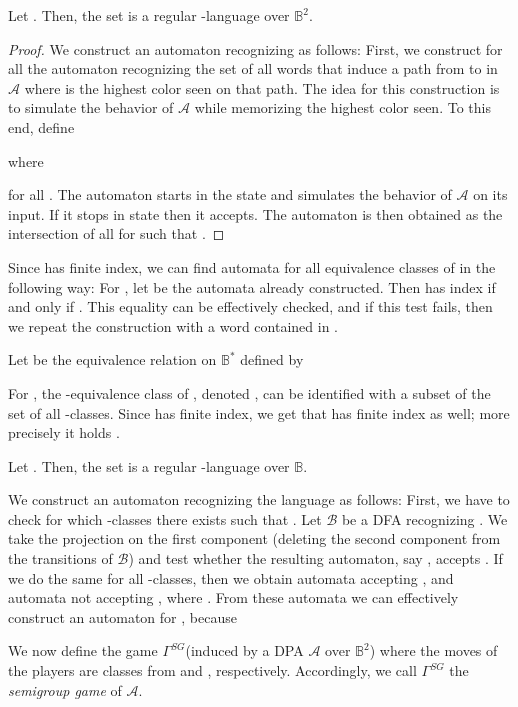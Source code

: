 \documentclass[fleqn,envcountsame]{LMCS}
\newcommand{\aut}[1]{\ensuremath{\mathcal{#1}}}
\newcommand{\GSG}{\ensuremath{\Gamma^{SG}}\xspace}
\newcommand{\B}{\ensuremath{\mathbb{B}}\xspace}
\newcommand{\Bst}{\ensuremath{\mathbb{B}^*}\xspace}
\newcommand{\Bsq}{\ensuremath{\mathbb{B}^2}\xspace}
\begin{document}
\begin{lem}\label{lem:sim_regular_class}
Let . Then, the set 
is a regular -language over \Bsq.
\end{lem}

\begin{proof}
We construct an automaton recognizing  as follows:
First, we construct for all  the automaton
 recognizing the set of all words that induce a path
from  to  in \aut{A} where  is the highest color seen on that
path. The idea for this construction is to simulate the behavior of
\aut{A} while memorizing the highest color seen. To this end, define

where

for all . The automaton starts in the state
 and simulates the behavior of \aut{A} on its input. If it
stops in state  then it accepts. The automaton 
is then obtained as the intersection of all  for 
such that  . 
\end{proof}

Since  has finite index, we can find automata for all equivalence
classes of  in the following way: For , let
 be the automata already constructed.
Then  has index  if and only if
.
This equality can be effectively checked, and if this test fails,
then we repeat the construction with a word contained in
.

Let  be
the equivalence relation on \Bst defined by

For , the -equivalence class of , denoted ,
can be identified with a subset of the set of all -classes.
Since  has finite index, we get that  has finite index as well;
more precisely it holds .

\begin{lem}\label{lem:approx_regular_class}
Let . Then, the set  is a regular -language over \B.
\end{lem}

\proof
We construct an automaton recognizing the language  as follows:
First, we have to check for which -classes 
there exists  such that
. Let \aut{B} be a DFA
recognizing . We take the projection on the
first component (deleting the second component from the transitions of \aut{B})
and test whether the resulting automaton, say , accepts .
If we do the same for all -classes,
then we obtain  automata  accepting
, and  automata  not accepting ,
where . From these automata we can effectively construct
an automaton for , because \label{pageref:definition_L_A_u}

We now define the game \GSG (induced by a DPA \aut{A} over \Bsq) where the moves of
the players are classes from  and , respectively.
Accordingly, we call \GSG the \emph{semigroup game} of \aut{A}.
\end{document}
